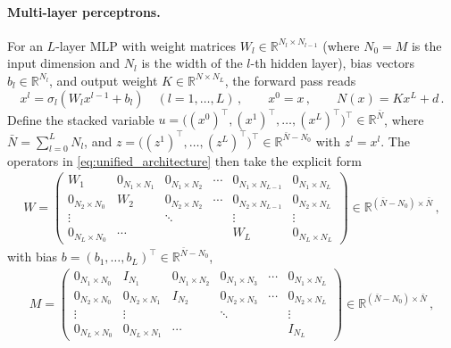 \paragraph{Multi-layer perceptrons.}
For an $L$-layer MLP with weight matrices $W_l \in \mathbb{R}^{N_l \times N_{l-1}}$ (where $N_0 = M$ is the input dimension and $N_l$ is the width of the $l$-th hidden layer), bias vectors $b_l \in \mathbb{R}^{N_l}$, and output weight $K \in \mathbb{R}^{N \times N_L}$, the forward pass reads
\begin{equation*}
    x^l = \sigma_l(W_l x^{l-1} + b_l) \quad (l=1,\ldots,L) \, , \qquad x^0 = x \, , \qquad N(x) = Kx^L + d \, .
\end{equation*}
Define the stacked variable $u = \bigl((x^0)^\top, (x^1)^\top, \ldots, (x^L)^\top\bigr)^\top \in \mathbb{R}^{\bar{N}}$, where $\bar{N} = \sum_{l=0}^L N_l$, and $z = \bigl((z^1)^\top, \ldots, (z^L)^\top\bigr)^\top \in \mathbb{R}^{\bar{N}-N_0}$ with $z^l = x^l$. The operators in \eqref{eq:unified_architecture} then take the explicit form \cite{wang2025unified}
\begin{align*}
    W = \begin{pmatrix}
        W_1 & 0_{N_1 \times N_1} & 0_{N_1 \times N_2} & \cdots & 0_{N_1 \times N_{L-1}} & 0_{N_1 \times N_L} \\
        0_{N_2 \times N_0} & W_2 & 0_{N_2 \times N_2} & \cdots & 0_{N_2 \times N_{L-1}} & 0_{N_2 \times N_L} \\
        \vdots & & \ddots & & \vdots & \vdots \\
        0_{N_L \times N_0} & \cdots & & & W_L & 0_{N_L \times N_L}
    \end{pmatrix} \in \mathbb{R}^{(\bar{N}-N_0) \times \bar{N}} \, ,
\end{align*}
with bias $b = (b_1, \ldots, b_L)^\top \in \mathbb{R}^{\bar{N}-N_0}$,
\begin{align*}
    M = \begin{pmatrix}
        0_{N_1 \times N_0} & I_{N_1} & 0_{N_1 \times N_2} & 0_{N_1 \times N_3} & \cdots & 0_{N_1 \times N_L} \\
        0_{N_2 \times N_0} & 0_{N_2 \times N_1} & I_{N_2} & 0_{N_2 \times N_3} & \cdots & 0_{N_2 \times N_L} \\
        \vdots & \vdots & & \ddots & & \vdots \\
        0_{N_L \times N_0} & 0_{N_L \times N_1} & \cdots & & & I_{N_L}
    \end{pmatrix} \in \mathbb{R}^{(\bar{N}-N_0) \times \bar{N}} \, ,
\end{align*}
